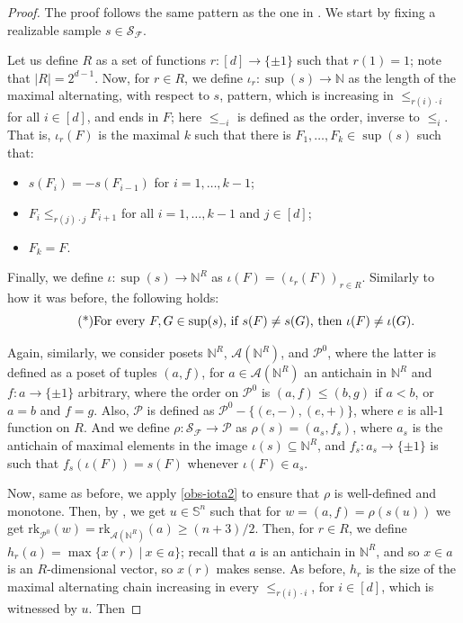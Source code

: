 \documentclass[10pt,a4paper]{amsart}
\newcommand{\A}{\mathcal{A}}
\newcommand{\F}{\mathcal{F}}
\newcommand{\N}{\mathbb{N}}
\newcommand{\PP}{\mathcal{P}}
\newcommand{\rk}{\mathrm{rk}}
\renewcommand{\SS}{\mathbb{S}}
\renewcommand{\S}{\mathcal{S}}
\begin{document}
\begin{proof}
	The proof follows the same pattern as the one in . We start by fixing a realizable sample $s\in \S_\F$.
	
	Let us define $R$ as a set of functions $r\colon [d]\rightarrow \{\pm 1\}$ such that $r(1) = 1$; note that $|R| = 2^{d-1}$. Now, for $r\in R$, we define $\iota_r \colon \sup(s) \rightarrow \N$ as the length of the maximal alternating, with respect to $s$, pattern, which is increasing in $\leq_{r(i)\cdot i}$ for all $i\in [d]$, and ends in $F$; here $\leq_{-i}$ is defined as the order, inverse to $\leq_i$.  That is, $\iota_r(F)$ is the maximal $k$ such that there is $F_1, \dots, F_k \in \sup(s)$ such that:
		\begin{itemize}
			\item $s(F_i) = -s(F_{i-1})$ for $i=1, \dots, k-1$;
			\item $F_i \leq_{r(j)\cdot j} F_{i+1}$ for all $i=1, \dots, k-1$ and $j\in [d]$;
			\item $F_k = F$.
		\end{itemize}
	Finally, we define $\iota \colon \sup (s) \rightarrow \N^R$ as $\iota(F) = \left(\iota_r(F)\right)_{r\in R}$. Similarly to how it was before, the following holds:
		\begin{equation}\label{obs-iota2}\tag{*}
		\text{\emph{For every $F, G \in \sup(s)$, if $s(F)\neq s(G)$, then $\iota(F)\neq \iota(G)$.}}
		\end{equation}	
		
	Again, similarly, we consider posets $\N^R$, $\A(\N^R)$, and $\PP^0$, where the latter is defined as a poset of tuples $(a, f)$, for $a\in \A(\N^R)$ an antichain in $\N^R$ and $f\colon a\rightarrow \{\pm 1\}$ arbitrary, where the order on $\PP^0$ is $(a, f)\leq (b, g)$ if $a<b$, or $a=b$ and $f=g$. Also, $\PP$ is  defined as $\PP^0 - \{(e, -), (e, +)\}$, where $e$ is all-$1$ function on $R$. And we define $\rho \colon \S_\F \rightarrow \PP$ as $\rho(s) = (a_s, f_s)$, where $a_s$ is the antichain of maximal elements in the image $\iota(s)\subseteq \N^R$, and $f_s \colon a_s\rightarrow \{\pm 1\}$ is such that $f_s(\iota(F)) = s(F)$ whenever $\iota(F)\in a_s$.
	
	Now, same as before, we apply \eqref{obs-iota2} to ensure that $\rho$ is well-defined and monotone.  Then, by , we get $u\in \SS^n$ such that for $w = (a,f) = \rho(s(u))$ we get $\rk_{\PP^0}(w) = \rk_{\A(\N^R)}(a) \geq (n+3)/2$. Then, for $r\in R$,  we define $h_r(a) = \max \{x(r)~|~x\in a\}$; recall that $a$ is an antichain in $\N^R$, and so $x\in a$ is an $R$-dimensional vector, so $x(r)$ makes sense. As before, $h_r$ is the size of the maximal alternating chain increasing in every $\leq_{r(i)\cdot i}$, for $i\in [d]$, which is witnessed by $u$. Then 
	 

\end{proof}
\end{document}
